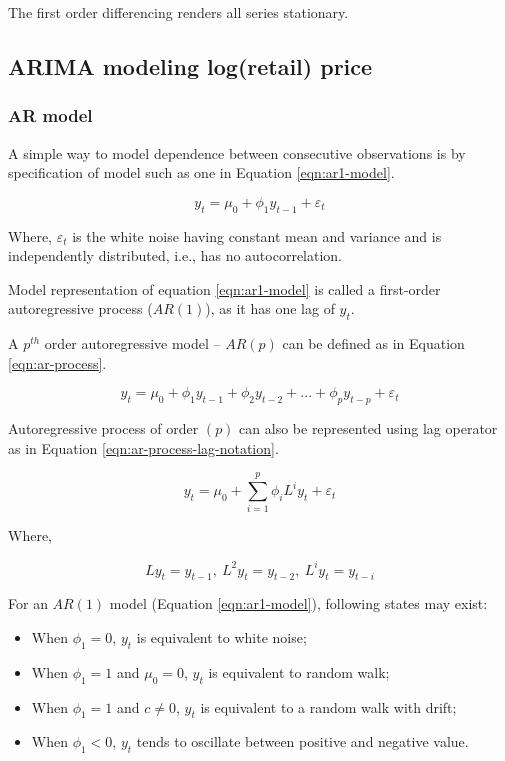 \documentclass[
  12pt,
]{article}
\providecommand{\tightlist}{%
  \setlength{\itemsep}{0pt}\setlength{\parskip}{0pt}}
\begin{document}
The first order differencing renders all series stationary.

\hypertarget{arima-modeling-logretail-price}{%
\subsection{ARIMA modeling log(retail) price}\label{arima-modeling-logretail-price}}

\hypertarget{ar-model}{%
\subsubsection{AR model}\label{ar-model}}

A simple way to model dependence between consecutive observations is by specification of model such as one in Equation \ref{eqn:ar1-model}.

\begin{equation}
\label{eqn:ar1-model}
y_t = \mu_0 + \phi_1 y_{t-1} + \varepsilon_t
\end{equation}

Where, \(\varepsilon_t\) is the white noise having constant mean and variance and is independently distributed, i.e., has no autocorrelation.

Model representation of equation \ref{eqn:ar1-model} is called a first-order autoregressive process (\(AR(1)\)), as it has one lag of \(y_t\).

A \(p^{th}\) order autoregressive model -- \(AR(p)\) can be defined as in Equation \ref{eqn:ar-process}.

\begin{equation}
\label{eqn:ar-process}
y_t = \mu_0 + \phi_1 y_{t-1} + \phi_2 y_{t-2} + ... + \phi_p y_{t - p} + \varepsilon_t
\end{equation}

Autoregressive process of order \((p)\) can also be represented using lag operator as in Equation \ref{eqn:ar-process-lag-notation}.

\begin{equation}
\label{eqn:ar-process-lag-notation}
y_t = \mu_0 + \sum_{i = 1}^{p}{\phi_i L^i y_t} + \varepsilon_t
\end{equation}

Where,

\[
L y_t = y_{t-1},\ L^2 y_t = y_{t-2},\ L^iy_t = y_{t-i}
\]

For an \(AR(1)\) model (Equation \ref{eqn:ar1-model}), following states may exist:

\begin{itemize}
\tightlist
\item
  When \(\phi_1 = 0\), \(y_t\) is equivalent to white noise;
\item
  When \(\phi_1 = 1\) and \(\mu_0 = 0\), \(y_t\) is equivalent to random walk;
\item
  When \(\phi_1 = 1\) and \(c \neq 0\), \(y_t\) is equivalent to a random walk with drift;
\item
  When \(\phi_1 < 0\), \(y_t\) tends to oscillate between positive and negative value.
\end{itemize}
\end{document}
